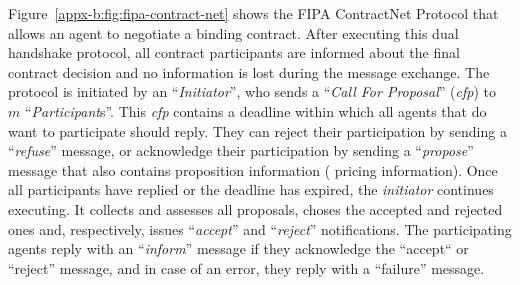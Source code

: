Figure~\ref{appx-b:fig:fipa-contract-net} shows the FIPA ContractNet Protocol that allows an agent to negotiate a binding contract.
After executing this dual handshake protocol, all contract participants are informed about the final contract decision and no information is lost during the message exchange.
The protocol is initiated by an ``\textit{Initiator}'', who sends a ``\textit{Call For Proposal}'' (\textit{cfp}) to $m$ ``\textit{Participant}s''.
This \textit{cfp} contains a deadline within which all agents that do want to participate should reply.
They can reject their participation by sending a ``\textit{refuse}'' message, or acknowledge their participation by sending a ``\textit{propose}'' message that also contains proposition information ( pricing information).
Once all participants have replied or the deadline has expired, the \textit{initiator} continues executing.
It collects and assesses all proposals, choses the accepted and rejected ones and, respectively, issues ``\textit{accept}'' and ``\textit{reject}'' notifications.
The participating agents reply with an ``\textit{inform}'' message if they acknowledge the ``accept`` or ``reject'' message, and in case of an error, they reply with a ``failure'' message.






